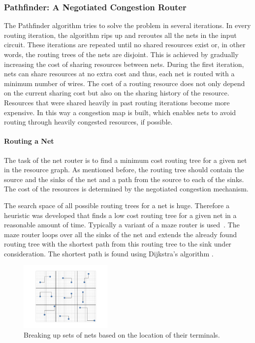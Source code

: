 \documentclass[a4paper,oneside,12pt]{article}
\begin{document}
\subsubsection{{\sc Pathfinder}: A Negotiated Congestion Router}
\label{sec:pathfinder}
The {\sc Pathfinder} algorithm \cite{pathfinder} tries to solve the problem in several iterations. In every routing iteration, the algorithm rips up and reroutes all the nets in the input circuit. These iterations are repeated until no shared resources exist \cite{nair1987asyetfgw} or, in other words, the routing trees of the nets are disjoint. This is achieved by gradually increasing the cost of sharing resources between nets. During the first iteration, nets can share resources at no extra cost and thus, each net is routed with a minimum number of wires. The cost of a routing resource does not only depend on the current sharing cost but also on the sharing history of the resource. Resources that were shared heavily in past routing iterations become more expensive. In this way a congestion map is built, which enables nets to avoid routing through heavily congested resources, if possible.

\paragraph{Routing a Net}
The task of the net router is to find a minimum cost routing tree for a given net in the resource graph. As mentioned before, the routing tree should contain the source and the sinks of the net and a path from the source to each of the sinks. The cost of the resources is determined by the negotiated congestion mechanism.

The search space of all possible routing trees for a net is huge. Therefore a heuristic was developed that finds a low cost routing tree for a given net in a reasonable amount of time. Typically a variant of a maze router is used~\cite{lee1961aafpcaia}. The maze router loops over all the sinks of the net and extends the already found routing tree with the shortest path from this routing tree to the sink under consideration. The shortest path is found using Dijkstra's algorithm \cite{dijkstra1959anotpicwg}.

\begin{figure}[ht]
\centering
\includegraphics[width = 0.4\textwidth,trim = 0mm 0mm 0mm 0mm, clip]{parallellisatie}
\caption{Breaking up sets of nets based on the location of their terminals.}
\label{geopara}
\end{figure}
\end{document}
